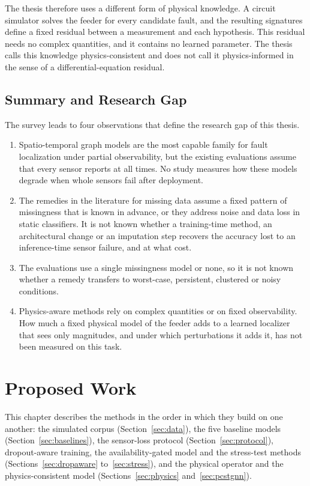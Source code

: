 \documentclass[MTech]{ugthesis}
\begin{document}
The thesis therefore uses a different form of physical knowledge. A circuit simulator solves the feeder for every candidate fault, and the resulting signatures define a fixed residual between a measurement and each hypothesis. This residual needs no complex quantities, and it contains no learned parameter. The thesis calls this knowledge physics-consistent and does not call it physics-informed in the sense of a differential-equation residual.

\section{Summary and Research Gap}

The survey leads to four observations that define the research gap of this thesis.

\begin{enumerate}
\item Spatio-temporal graph models are the most capable family for fault localization under partial observability, but the existing evaluations assume that every sensor reports at all times. No study measures how these models degrade when whole sensors fail after deployment.
\item The remedies in the literature for missing data assume a fixed pattern of missingness that is known in advance, or they address noise and data loss in static classifiers. It is not known whether a training-time method, an architectural change or an imputation step recovers the accuracy lost to an inference-time sensor failure, and at what cost.
\item The evaluations use a single missingness model or none, so it is not known whether a remedy transfers to worst-case, persistent, clustered or noisy conditions.
\item Physics-aware methods rely on complex quantities or on fixed observability. How much a fixed physical model of the feeder adds to a learned localizer that sees only magnitudes, and under which perturbations it adds it, has not been measured on this task.
\end{enumerate}

\chapter{Proposed Work}
\label{chap:proposed}

This chapter describes the methods in the order in which they build on one another: the simulated corpus (Section~\ref{sec:data}), the five baseline models (Section~\ref{sec:baselines}), the sensor-loss protocol (Section~\ref{sec:protocol}), dropout-aware training, the availability-gated model and the stress-test methods (Sections~\ref{sec:dropaware} to~\ref{sec:stress}), and the physical operator and the physics-consistent model (Sections~\ref{sec:physics} and~\ref{sec:pcstgnn}).
\end{document}
